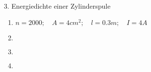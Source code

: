 \documentclass{alex_hü}
\begin{document}
\begin{mybox}{3. Energiedichte einer Zylinderspule}
	\centering \( \)
	\tcblower
	\begin{enumerate}
		\item \( n = 2000;\quad A = 4 \unit{cm^2};\quad l = 0.3 \unit{m};\quad I = 4 \unit{A} \)
	\tcbline
		\item \(  \)
	\tcbline
		\item \(  \)
		\begin{flalign*}
		\end{flalign*}
	\tcbline
		\item 
%			
	\end{enumerate}
\end{mybox}
\end{document}
